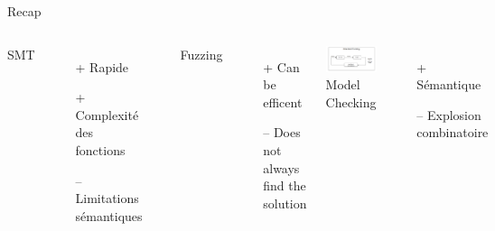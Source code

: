 \documentclass{beamer}
\begin{document}
\begin{frame}{Recap}

\begin{columns}
	SMT
	\begin{itemize}
		\item[+] Rapide
		\item[+] Complexité des fonctions 
		\item[--] Limitations sémantiques
	\end{itemize}
	\includegraphics[width=\textwidth]{Figures/SMT_sumup}
	
	Fuzzing
	\begin{itemize}
		\item[+] Can be efficent
		\item[--] Does not always find the solution
	\end{itemize}
	
	\includegraphics[width=\textwidth]{Figures/Fuzzing_sumup}    
	Model Checking
	\begin{itemize}
		\item[+] Sémantique 
		\item[--] Explosion combinatoire
		

\end{itemize}
\end{columns}
\end{frame}
\end{document}
